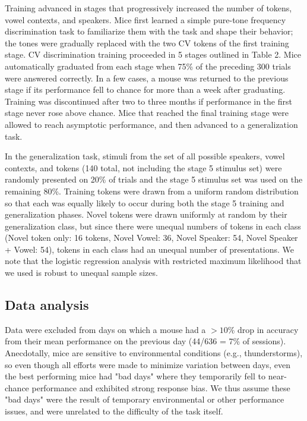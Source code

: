 \documentclass[preprint, NumberedRefs]{JASAnew}\usepackage[]{graphicx}\usepackage[]{color}
\begin{document}
Training advanced in stages that progressively increased the number of tokens, vowel contexts, and speakers. Mice first learned a simple pure-tone frequency discrimination task to familiarize them with the task and shape their behavior; the tones were gradually replaced with the two CV tokens of the first training stage. CV discrimination training proceeded in 5 stages outlined in Table 2. Mice automatically graduated from each stage when 75\% of the preceding 300 trials were answered correctly. In a few cases, a mouse was returned to the previous stage if its performance fell to chance for more than a week after graduating. Training was discontinued after two to three months if performance in the first stage never rose above chance. Mice that reached the final training stage were allowed to reach asymptotic performance, and then advanced to a generalization task.%

In the generalization task, stimuli from the set of all possible speakers, vowel contexts, and tokens (140 total, not including the stage 5 stimulus set) were randomly presented on 20\% of trials and the stage 5 stimulus set was used on the remaining 80\%. Training tokens were drawn from a uniform random distribution so that each was equally likely to occur during both the stage 5 training and generalization phases. Novel tokens were drawn uniformly at random by their generalization class, but since there were unequal numbers of tokens in each class (Novel token only: 16 tokens, Novel Vowel: 36, Novel Speaker: 54, Novel Speaker + Vowel: 54), tokens in each class had an unequal number of presentations. We note that the logistic regression analysis with restricted maximum likelihood that we used is robust to unequal sample sizes\cite{Patterson1971}.

\subsection{Data analysis}
Data were excluded from days on which a mouse had a $>10\%$ drop in accuracy from their mean performance on the previous day (44/636 = 7\% of sessions). Anecdotally, mice are sensitive to environmental conditions (e.g., thunderstorms), so even though all efforts were made to minimize variation between days, even the best performing mice had "bad days" where they temporarily fell to near-chance performance and exhibited strong response bias. We thus assume these "bad days" were the result of temporary environmental or other performance issues, and were unrelated to the difficulty of the task itself. 
\end{document}
